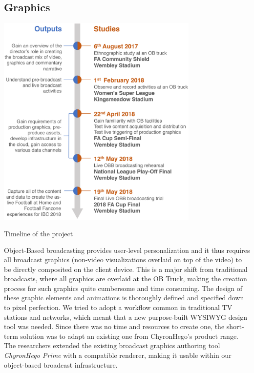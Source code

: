 \documentclass[sigchi-a, authorversion]{acmart}
\begin{document}

\subsection{Graphics}

\begin{marginfigure}
    \hspace*{-2cm}
    \includegraphics[width=10cm]{Figures/timeline.png}
    \caption{Timeline of the project}
    \label{fig:timeline}
\end{marginfigure}

Object-Based broadcasting provides user-level personalization and it thus
requires all broadcast graphics (non-video visualizations overlaid on top of
the video) to be directly composited on the client device. This is a major shift
from traditional broadcasts, where all graphics are overlaid at the OB Truck,
making the creation process for such graphics quite cumbersome and time consuming.
The design of these graphic elements and animations is thoroughly defined and
specified down to pixel perfection. We tried to adopt a workflow common in traditional
TV stations and networks, which meant that a new purpose-built WYSIWYG design
tool was needed. Since there was no time and resources to create one, the
short-term solution was to adapt an existing one from ChyronHego's product range. The researchers extended the existing
broadcast graphics authoring tool \emph{ChyronHego Prime} with a compatible renderer,
making it usable within our object-based broadcast infrastructure.
\end{document}

